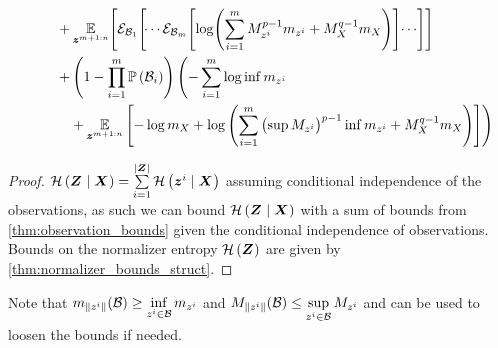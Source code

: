\begin{proposition}
\begin{equation}
\begin{split}
			& \quad\phantomeq+\E_{\observationRV{}{m+1:n}}\Biggl[\partexp_{\subSpace_1}\Biggl[\dotsi\partexp_{\subSpace_m}\Biggl[
			\log \Biggl(\sum_{i=1}^{m} M_{\observation{}{i}}^{p-1}m_{\observation{}{i}}+M_{\states{}}^{q-1}m_{\states{}}\Biggr)\Biggr]\dotsi\Biggr]\Biggr]                                                                    \\
			& \quad\phantomeq+\left(1-\prod_{i=1}^m\measure{\subSpace_i}\right)\Biggl(-\sum_{i=1}^m\log \inf m_{\observation{}{i}}\\
			& \quad\quad\phantomeq+\E_{\observationRV{}{m+1:n}}\left[-\log m_{\states{}}+\log\left(\sum_{i=1}^{m}\left(\sup M_{\observation{}{i}}\right)^{p-1}\inf m_{\observation{}{i}} +M_{\states{}}^{q-1}m_{\states{}}\right)\right]\Biggr)
		\end{split}
	\end{equation}
\end{proposition}
\begin{proof}
	$\mathcal{H}\left({\boldsymbol Z_{}}\mid{\ensuremath{\boldsymbol X_{}}}\right)=\sum\limits_{i=1}^{\lvert\boldsymbol Z_{}\rvert}\mathcal{H}\left({\boldsymbol z_{}^{i}}\mid{\ensuremath{\boldsymbol X_{}}}\right)$ assuming conditional independence of the observations, as such we can bound $\mathcal{H}\left({\boldsymbol Z_{}}\mid{\ensuremath{\boldsymbol X_{}}}\right)$ with a sum of bounds from \autoref{thm:observation_bounds} given the conditional independence of observations. Bounds on the normalizer entropy $\mathcal{H}\left({\boldsymbol Z_{}}\right)$ are given by \autoref{thm:normalizer_bounds_struct}.
\end{proof}

Note that $m_{\lVert z_{}^{i}\rVert}(\mathcal B)\geq \inf\limits_{z_{}^{i}\in\mathcal B}m_{z_{}^{i}}$ and $M_{\lVert z_{}^{i}\rVert}(\mathcal B)\leq \sup\limits_{z_{}^{i}\in\mathcal B}M_{z_{}^{i}}$ and can be used to loosen the bounds if needed.


